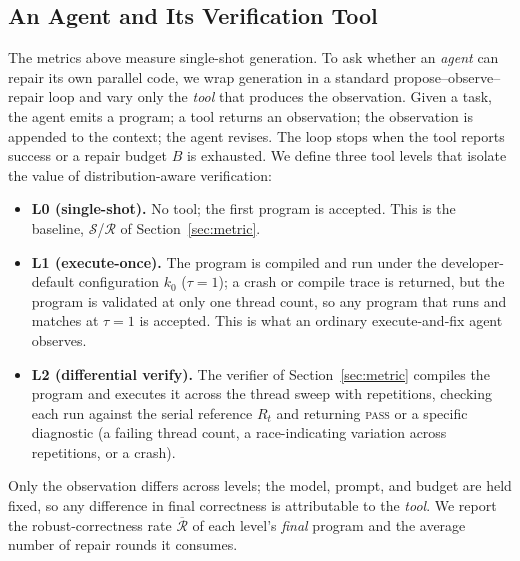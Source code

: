 \subsection{An Agent and Its Verification Tool}
\label{sec:agent}
The metrics above measure single-shot generation. To ask whether an \emph{agent}
can repair its own parallel code, we wrap generation in a standard
propose--observe--repair loop and vary only the \emph{tool} that produces the
observation. Given a task, the agent emits a program; a tool returns an
observation; the observation is appended to the context; the agent revises. The
loop stops when the tool reports success or a repair budget $B$ is exhausted. We
define three tool levels that isolate the value of distribution-aware
verification:
\begin{itemize}
\item \textbf{L0 (single-shot).} No tool; the first program is accepted. This is
the baseline, $\mathcal{S}$/$\mathcal{R}$ of Section~\ref{sec:metric}.
\item \textbf{L1 (execute-once).} The program is compiled and run under the
developer-default configuration $k_0$ ($\tau{=}1$); a crash or compile trace is
returned, but the program is validated at only one thread count, so any program
that runs and matches at $\tau{=}1$ is accepted. This is what an ordinary
execute-and-fix agent observes.
\item \textbf{L2 (differential verify).} The verifier of
Section~\ref{sec:metric} compiles the program and executes it across the thread
sweep with repetitions, checking each run against the serial reference $R_t$ and
returning \textsc{pass} or a specific diagnostic (a failing thread count, a
race-indicating variation across repetitions, or a crash).
\end{itemize}
Only the observation differs across levels; the model, prompt, and budget are
held fixed, so any difference in final correctness is attributable to the
\emph{tool}. We report the robust-correctness rate $\overline{\mathcal{R}}$ of
each level's \emph{final} program and the average number of repair rounds it
consumes.
